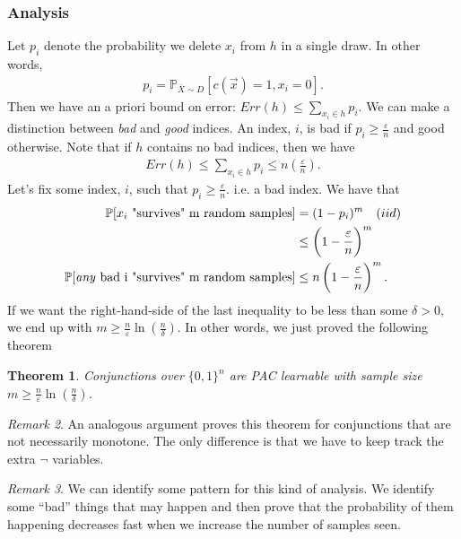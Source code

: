 \documentclass[12pt, letterpaper]{article}
\numberwithin{equation}{section} %
\newcommand{\mb}{\mathbb}
\newcommand{\ve}{\varepsilon}
\newtheorem{theorem}{Theorem}[section]
\theoremstyle{definition}
\theoremstyle{remark}
\newtheorem{remark}[theorem]{Remark}
\begin{document}
\subsubsection*{Analysis}

Let $p_i$ denote the probability we delete $x_i$ from $h$ in a single draw. In other words,
\begin{align}
    p_i = \mb P_{\bar X\sim D}[c(\vec x) = 1, x_i=0].
\end{align}
Then we have an a priori bound on error: $Err(h) \leq \sum\limits_{x_i\in h} p_i$.
 We can make a distinction between \emph{bad} and \emph{good} indices. 
 An index, $i$, is bad if $p_i\geq \frac{\ve}{n}$ and good otherwise. 
 Note that if $h$ contains no bad indices, then we have
\begin{align}
    Err(h) \leq \sum\limits_{x_i\in h} p_i \leq n\left(\frac{\ve}{n}\right).
\end{align}
Let's fix some index, $i$, such that $p_i\geq \frac\ve n$. i.e. a bad index. We have that
\begin{align}
    \mb P[x_i\textrm{ "survives" m random samples}] &= (1 - p_i)^m \quad (iid)\\
    & \leq \left(1 - \frac\ve n\right)^m \\
    \mb P[\textrm{\emph{any} bad i "survives" m random samples}] &\leq n\left(1 - \frac\ve n\right)^m.
\end{align}
If we want the right-hand-side of the last inequality to be less than some $\delta>0$, we end up with $m \geq \frac n\ve \ln\left(\frac n\delta\right)$. 
In other words, we just proved the following theorem

\begin{theorem}
    Conjunctions over $\lbrace 0,1 \rbrace^n$ are PAC learnable with sample size  $m \geq \frac n\ve \ln\left(\frac n\delta\right)$.
\end{theorem}

\begin{remark}
    An analogous argument proves this theorem for conjunctions that are not necessarily monotone. 
    The only difference is that we have to keep track the extra $\lnot$ variables.
\end{remark}

\begin{remark}
    We can identify some pattern for this kind of analysis. 
    We identify some ``bad'' things that may happen and then prove that the probability of them happening decreases fast when we increase the number of samples seen.
\end{remark}
\end{document}

